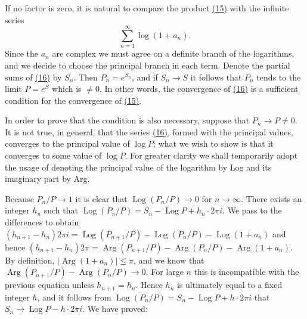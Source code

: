 If no factor is zero, it is natural to compare the product \hyperref[eq:5.15]{(15)} with the infinite series
\begin{equation*}
\sum_ {n = 1} ^ {\infty} \log (1 + a _ {n}).\tag{16}\label{eq:5.16}
\end{equation*}
Since the $a_{n}$ are complex we must agree on a definite branch of the logarithms, and we decide to choose the principal branch in each term. Denote the partial sums of \hyperref[eq:5.16]{(16)} by $S_{n}$. Then $P_{n} = e^{S_{n}}$, and if $S_{n} \to S$ it follows that $P_{n}$ tends to the limit $P = e^{S}$ which is $\neq 0$. In other words, the convergence of \hyperref[eq:5.16]{(16)} is a sufficient condition for the convergence of \hyperref[eq:5.15]{(15)}.

In order to prove that the condition is also necessary, suppose that $P_{n} \rightarrow P \neq 0$. It is not true, in general, that the series \hyperref[eq:5.16]{(16)}, formed with the principal values, converges to the principal value of $\log P$; what we wish to show is that it converges to some value of $\log P$. For greater clarity we shall temporarily adopt the usage of denoting the principal value of the logarithm by Log and its imaginary part by Arg.


Because $P_{n} / P \to 1$ it is clear that $\operatorname{Log}(P_n / P) \to 0$ for $n \to \infty$. There exists an integer $h_n$ such that $\operatorname{Log}(P_n / P) = S_n - \operatorname{Log} P + h_n \cdot 2\pi i$. We pass to the differences to obtain $(h_{n+1} - h_n)2\pi i = \operatorname{Log}(P_{n+1} / P) - \operatorname{Log}(P_n / P) - \operatorname{Log}(1 + a_n)$ and hence $(h_{n+1} - h_n)2\pi = \operatorname{Arg}(P_{n+1} / P) - \operatorname{Arg}(P_n / P) - \operatorname{Arg}(1 + a_n)$. By definition, $|\operatorname{Arg}(1 + a_n)| \leq \pi$, and we know that $\operatorname{Arg}(P_{n+1} / P) - \operatorname{Arg}(P_n / P) \to 0$. For large $n$ this is incompatible with the previous equation unless $h_{n+1} = h_n$. Hence $h_n$ is ultimately equal to a fixed integer $h$, and it follows from $\operatorname{Log}(P_n / P) = S_n - \operatorname{Log} P + h \cdot 2\pi i$ that $S_n \to \operatorname{Log} P - h \cdot 2\pi i$. We have proved:

